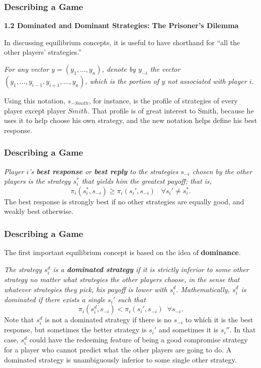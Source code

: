 \begin{frame}[fragile]\frametitle{Describing a Game}
   {\bf  1.2 Dominated and Dominant Strategies:  The
Prisoner's Dilemma }

 In discussing equilibrium concepts, it is useful to have shorthand for
``all the other players' strategies.''

  {\it For any vector $y= (y_1,\ldots,y_n)$, denote by $y_{-i}$ the
vector $(y_1,\ldots,y_{i-1},y_{i+1},\ldots,y_n)$, which is the portion of $y$
not associated with player $i$.}

   Using this notation, $s_{-Smith}$, for instance, is the profile of
strategies of every player except player $Smith$.  That profile is of great
interest to  Smith, because he uses it to help choose his own strategy, and the
new notation helps define his best response.

\end{frame}
 \begin{frame}[fragile]\frametitle{Describing a Game}
 
 {\it Player $i$'s {\bf best response} or {\bf best reply} to the strategies
$s_{-i}$ chosen by the other players is the strategy $s^*_i$ that yields him the
greatest payoff; that is,} \begin{equation} \label{e3}
 \pi_i(s_i^*,s_{-i}) \geq \pi_i(s_i',s_{-i})\;\;\; \forall s_i' \neq s_i^*.
\end{equation}
 The best response is strongly best if no other strategies are equally good, and
weakly best otherwise.

\end{frame}
 \begin{frame}[fragile]\frametitle{Describing a Game}
 The first important equilibrium concept is based on the idea of {\bf
dominance}.


 {\it  The  strategy $s_i^d$ is  a {\bf dominated strategy} if it is strictly
inferior to some other strategy no matter what strategies the other players
choose, in the sense that whatever strategies they pick, his payoff is lower
with $s_i^d$. Mathematically, $s_i^d$ is dominated if  there exists  a single
$s_i'$  such that}
\begin{equation} \label{e4}
 \pi_i(s_i^d,s_{-i}) < \pi_i(s_i',s_{-i}) \;\; \forall s_{-i}.
 \end{equation}
  Note that $s_i^d $ is not a dominated strategy if there is no $ s_{-i}$ to
which it is the  best response, but sometimes the better strategy is $s_i'$  and
sometimes it is $s_i''$. In that case, $s_i^d $ could have the redeeming feature
of being a good compromise strategy for a player who  cannot predict  what the
other players are going to do. A dominated strategy is unambiguously inferior to
some single other strategy.

\end{frame}
